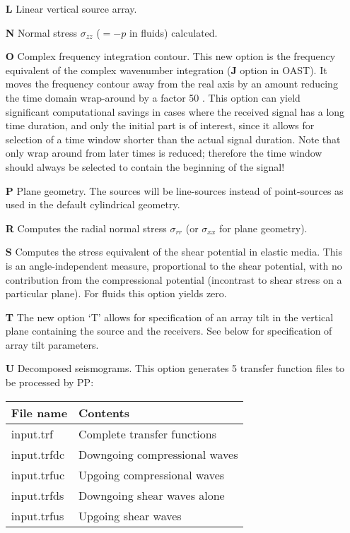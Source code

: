 \begin{itemize}
	     \item[{\bf L}] Linear vertical source array.
	     \item[{\bf N}] Normal stress $\sigma_{zz}$ ($=-p$ in
fluids)  calculated.
    \item[{\bf O}]     Complex frequency integration contour. This new  option 
          is  the frequency equivalent of the complex  wavenumber 
          integration ({\bf J} option in OAST). It moves the  frequency 
          contour  away from the real axis by an amount  reducing 
          the time domain wrap-around by a factor 50 \cite{jkps}. This option 
          can  yield significant computational savings  in  cases 
          where the received signal has a long time duration, and 
          only  the initial part is of interest, since it  allows 
          for selection of a time window shorter than the  actual 
          signal duration. Note that only wrap around from  later 
          times  is  reduced; therefore the  time  window  should 
          always  be  selected to contain the  beginning  of  the 
          signal! 
	     \item[{\bf P}] Plane geometry. The sources will be line-sources
		instead of point-sources as used in the default
		cylindrical geometry.
    \item[{\bf R}] Computes the radial normal stress $\sigma_{rr}$ (or $\sigma_{xx}$ 			for plane geometry).
    \item[{\bf S}] Computes the stress equivalent of the shear potential in
         elastic media. This is an angle-independent measure, proportional to 
         the shear potential, with no contribution from the compressional 
         potential (incontrast to shear stress on a particular plane). 
        	For fluids this option yields zero.
    \item[{\bf T}] The new option `T' allows for specification of an
          array  tilt in the
          vertical plane containing the source and the receivers. 
          See below for specification of array tilt parameters.
    \item[{\bf U}]     Decomposed   seismograms.  This  option  generates  5 
          transfer function files to be processed by PP:

          \begin{tabular}{ll}
          File name & Contents \\ \hline
          input.trf &     Complete transfer functions \\
          input.trfdc &    Downgoing compressional waves \\
          input.trfuc  &  Upgoing compressional waves  \\
          input.trfds  &  Downgoing  shear waves alone \\
          input.trfus &    Upgoing shear waves
          \end{tabular}


\end{itemize}

